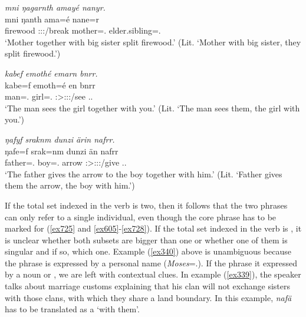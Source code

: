 \begin{exe}
	\ex \emph{mni ŋagarnth amayé nanyr.}\\
	\gll mni ŋanth ama=é nane=r\\
	firewood \Stdu:\Sbj:\Nonpast:\Ipfv/break mother=\Erg.\Nsg{} {elder.sibling}=\Assoc.\Du\\
	\trans `Mother together with big sister split firewood.' (Lit. `Mother with big sister, they split firewood.')
	\label{ex605}
\end{exe}
\begin{exe}
	\ex \emph{kabef emothé emarn bnrr.}\\
	\gll kabe=f emoth=é en bnrr\\
	man=\Erg.\Sg{} girl=\Abs.\Nsg{} \Stsg:\Sbj>\Stdu:\Obj:\Nonpast:\Ipfv/see \Second.\Du.\Assoc\\
	\trans `The man sees the girl together with you.' (Lit. `The man sees them, the girl with you.')
	\label{ex727}
\end{exe}
\begin{exe}
	\ex \emph{ŋafyf sraknm dunzi ärin nafrr.}\\
	\gll ŋafe=f srak=nm dunzi än nafrr\\
	father=\Erg.\Sg{} boy=\Dat.\Nsg{} arrow \Stsg:\Sbj>\Stdu:\Io:\Nonpast:\Ipfv/give \Third.\Du.\Assoc\\
	\trans `The father gives the arrow to the boy together with him.' (Lit. `Father gives them the arrow, the boy with him.')
	\label{ex728}
\end{exe}

If the total set indexed in the verb is two, then it follows that the two phrases can only refer to a single individual, even though the core phrase has to be marked for  (\ref{ex725} and \ref{ex605}-\ref{ex728}). If the total set indexed in the verb is , it is unclear whether both subsets are bigger than one or whether one of them is singular and if so, which one. Example (\ref{ex340}) above is unambiguous because the  phrase is expressed by a personal name (\emph{Moses}=\Assoc.\Pl). If the  phrase it expressed by a noun or , we are left with contextual clues. In example (\ref{ex339}), the speaker talks about marriage customs explaining that his clan will not exchange sisters with those clans, with which they share a land boundary. In this example, \emph{nafä} has to be translated as a  `with them'.

